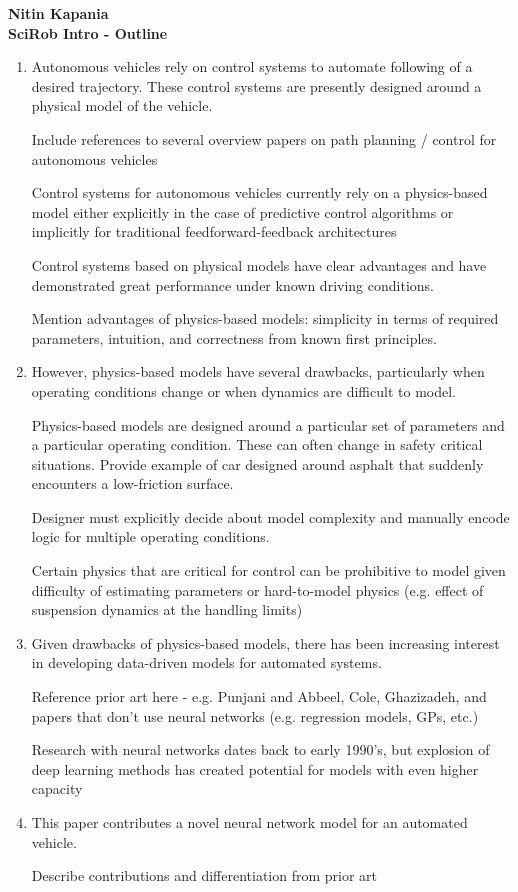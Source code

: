 \documentclass[11pt]{article}
\begin{document}
\textbf{Nitin Kapania} \\
\textbf{SciRob Intro - Outline} \\

\begin{enumerate}
	\item Autonomous vehicles rely on control systems to automate following of a desired trajectory. These control systems are presently designed around a physical model of the vehicle. 

	\subitem Include references to several overview papers on path planning / control
	for autonomous vehicles
	
	\subitem Control systems for autonomous vehicles currently rely on a  physics-based model either explicitly in the case of predictive control algorithms or implicitly for traditional feedforward-feedback architectures
	
	\subitem Control systems based on physical models have clear advantages and have demonstrated great performance under known driving conditions. 

	\subitem Mention advantages of physics-based models: simplicity in terms of required parameters, intuition, and correctness from known first principles.  

	\item However, physics-based models have several drawbacks, particularly when operating conditions change or when dynamics are difficult to model. 

	\subitem Physics-based models are designed around a particular set of parameters and a particular operating condition. These can often change in safety critical situations. Provide example of car designed around asphalt that suddenly encounters a low-friction surface. 

	\subitem Designer must explicitly decide about model complexity and manually encode logic for multiple operating conditions.  

	\subitem Certain physics that are critical for control can be prohibitive to model given difficulty of estimating parameters or hard-to-model physics (e.g. effect of suspension dynamics at the handling limits)  

	\item Given drawbacks of physics-based models, there has been increasing interest in developing data-driven models for automated systems. 

	\subitem Reference prior art here - e.g. Punjani and Abbeel, Cole, Ghazizadeh, and papers that don't use neural networks (e.g. regression models, GPs, etc.)

	\subitem Research with neural networks dates back to early 1990's, but  explosion of deep learning methods has created potential for models with even higher capacity

	\item This paper contributes a novel neural network model for an automated vehicle. 

	\subitem Describe contributions and differentiation from prior art 

\end{enumerate}
\end{document}
